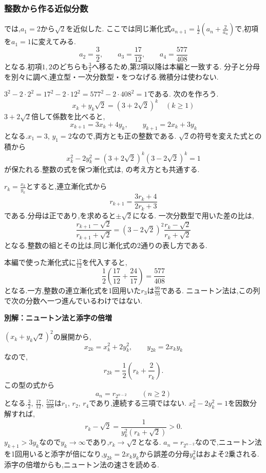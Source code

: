 \subsubsection{整数から作る近似分数}\label{節：整数から作る近似分数}
では,$a_1=2$から$\sqrt2$を近似した.
ここでは同じ漸化式$a_{n+1}=\frac12\left(a_n+\frac{2}{a_n}\right)$で,初項を$a_1=1$に変えてみる.
\[
  a_2=\frac32,\qquad a_3=\frac{17}{12},\qquad a_4=\frac{577}{408}
\]
となる.初項$1,2$のどちらも$\frac{3}{2}$へ移るため,第2項以降は本編と一致する.
分子と分母を別々に調べ,連立型・一次分数型・をつなげる.微積分は使わない.

$3^2-2\cdot2^2=17^2-2\cdot12^2=577^2-2\cdot408^2=1$である.
次のを作ろう.
\[
  x_k+y_k\sqrt2=(3+2\sqrt2)^k\quad(k\ge1)
\]
$3+2\sqrt2$倍して係数を比べると,
\[
  x_{k+1}=3x_k+4y_k,\qquad y_{k+1}=2x_k+3y_k
\]
となる.$x_1=3$, $y_1=2$なので,両方とも正の整数である.
$\sqrt2$の符号を変えた式との積から
\[
  x_k^2-2y_k^2=(3+2\sqrt2)^k(3-2\sqrt2)^k=1
\]
が保たれる.整数の式を保つ漸化式は,
の考え方とも共通する.

$r_k=\frac{x_k}{y_k}$とすると,連立漸化式から
\[
  r_{k+1}=\frac{3r_k+4}{2r_k+3}
\]
である.分母は正であり,を求めると$\pm\sqrt2$になる.
一次分数型で用いた差の比は,
\[
  \frac{r_{k+1}-\sqrt2}{r_{k+1}+\sqrt2}
  =(3-2\sqrt2)^2
  \frac{r_k-\sqrt2}{r_k+\sqrt2}
\]
となる.整数の組とその比は,同じ漸化式の2通りの表し方である.

本編で使った漸化式に$\frac{17}{12}$を代入すると,
\[
  \frac12\left(\frac{17}{12}+\frac{24}{17}\right)=\frac{577}{408}
\]
となる.一方,整数の連立漸化式を1回用いた$r_3$は$\frac{99}{70}$である.
ニュートン法は,この列で次の分数へ一つ進んでいるわけではない.

\par\medskip\noindent\textbf{別解：ニュートン法と添字の倍増}\par\nobreak\smallskip
$(x_k+y_k\sqrt2)^2$の展開から,
\[
  x_{2k}=x_k^2+2y_k^2,\qquad y_{2k}=2x_ky_k
\]
なので,
\[
  r_{2k}=\frac12\left(r_k+\frac2{r_k}\right).
\]
この型の式から
\[
  a_n=r_{2^{n-2}}\qquad(n\ge2)
\]
となる.$\frac{3}{2}$, $\frac{17}{12}$, $\frac{577}{408}$は$r_1$, $r_2$, $r_4$であり,連続する三項ではない.
\BookFigPellDoubling
$x_k^2-2y_k^2=1$を因数分解すれば,
\[
  r_k-\sqrt2=\frac1{y_k^2(r_k+\sqrt2)}>0.
\]
$y_{k+1}>3y_k$なので$y_k\to\infty$であり,$r_k\to\sqrt2$となる.
$a_n=r_{2^{n-2}}$なので,ニュートン法を1回用いると添字が倍になり,$y_{2k}=2x_ky_k$から誤差の分母$y_k^2$はおよそ2乗される.
添字の倍増からも,ニュートン法の速さを読める.

